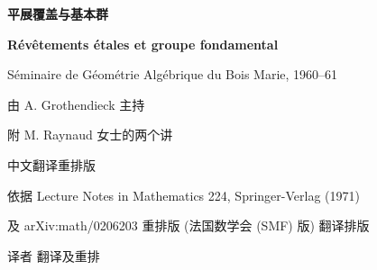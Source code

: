 \documentclass[11pt, fontsetup=font-setup-open.tex, titlesetup=titles-setup.tex, geometry=a4]{AJbook}
\begin{document}
\hypersetup{colorlinks=true, linkcolor=MidnightBlue, citecolor=BrickRed, urlcolor=MidnightBlue}

\begin{titlepage}
\centering
\vspace*{2.0cm}
{\Huge\bfseries 平展覆盖与基本群\par}
\vspace{0.9cm}
{\large\bfseries Révêtements étales et groupe fondamental\par}
\vspace{1.6cm}
{\large Séminaire de Géométrie Algébrique du Bois Marie, 1960--61\par}
\vspace{0.7cm}
{\large 由 A. Grothendieck 主持\par}
\vspace{0.4cm}
{\large 附 M. Raynaud 女士的两个讲\par}
\vspace{3.2cm}
{\large 中文翻译重排版\par}
\vfill
{\small 依据 Lecture Notes in Mathematics 224, Springer-Verlag (1971)\par}
{\small 及 arXiv:math/0206203 重排版 (法国数学会 (SMF) 版) 翻译排版\par}
\vspace{0.5em}
{\normalsize 译者 翻译及重排\par}
\end{titlepage}

\frontmatter


\mainmatter
\begin{refsection}\end{refsection}
\begin{refsection}\end{refsection}
\begin{refsection}\end{refsection}
\begin{refsection}\end{refsection}
\begin{refsection}\end{refsection}
\begin{refsection}\end{refsection}
\begin{refsection}\end{refsection}
\begin{refsection}\end{refsection}
\begin{refsection}\end{refsection}
\begin{refsection}\end{refsection}
\begin{refsection}\end{refsection}
\begin{refsection}\end{refsection}

\backmatter
\printindex[term]
\printindex[notations]
\end{document}
